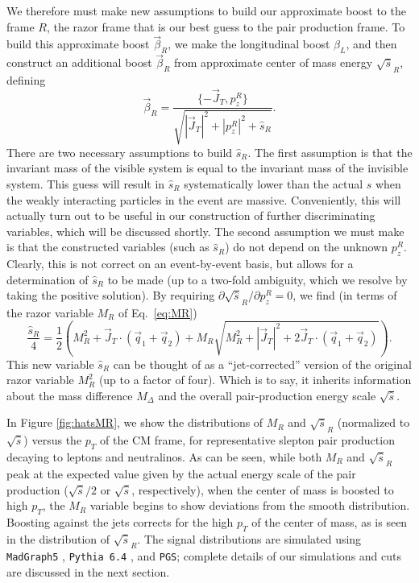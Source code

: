 We therefore must make new assumptions to build our approximate boost to the frame $R$, the razor frame that is our best guess to the pair production frame. To build this approximate boost $\vec{\beta}_R$, we make the longitudinal boost $\beta_L$, and then construct an additional boost $\vec{\beta}_R$ from approximate center of mass energy $\sqrt{\hat{s}}_R$, defining
\begin{equation}
\vec{\beta}_R = \frac{\{-\vec{J}_T,p^R_z\}}{\sqrt{|\vec{J}_T|^2+|p^R_z|^2+\hat{s}_R}}. \label{eq:razorbeta}
\end{equation}
There are two necessary assumptions to build $\hat{s}_R$. The first assumption is that the invariant mass of the visible system is equal to the invariant mass of the invisible system. This guess will result in $\hat{s}_R$ systematically lower than the actual $\hat{s}$ when the weakly interacting particles in the event are massive. Conveniently, this will actually turn out to be useful in our construction of further discriminating variables, which will be discussed shortly. The second assumption we must make is that the constructed variables (such as $\hat{s}_R$) do not depend on the unknown $p_z^R$. Clearly, this is not correct on an event-by-event basis, but allows for a determination of $\hat{s}_R$ to be made (up to a two-fold ambiguity, which we resolve by taking the positive solution). By requiring $\partial \sqrt{\hat{s}}_R/\partial p_z^R = 0$, we find (in terms of the razor variable $M_R$ of Eq.~\eqref{eq:MR})
\begin{equation}
\frac{\hat{s}_R}{4} = \frac{1}{2}\left( M_R^2 + \vec{J}_T\cdot(\vec{q}_1+\vec{q}_2) + M_R \sqrt{M_R^2+|\vec{J}_T|^2+2\vec{J}_T\cdot(\vec{q}_1+\vec{q}_2)}\right). \label{eq:hatsR}
\end{equation}
This new variable $\hat{s}_R$ can be thought of as a ``jet-corrected'' version of the original razor variable $M_R^2$ (up to a factor of four). Which is to say, it inherits information about the mass difference $M_\Delta$ and the overall pair-production energy scale $\sqrt{\hat{s}}$. 

In Figure \ref{fig:hatsMR}, we show the distributions of $M_R$ and $\sqrt{\hat{s}}_R$ (normalized to $\sqrt{\hat{s}}$) versus the $p_T$ of the CM frame, for representative slepton pair production decaying to leptons and neutralinos. As can be seen, while both $M_R$ and $\sqrt{\hat{s}}_R$ peak at the expected value given by the actual energy scale of the pair production ($\sqrt{\hat{s}}/2$ or $\sqrt{\hat{s}}$, respectively), when the center of mass is boosted to high $p_T$, the $M_R$ variable begins to show deviations from the smooth distribution. Boosting against the jets corrects for the high $p_T$ of the center of mass, as is seen in the distribution of $\sqrt{\hat{s}}_R$. The signal distributions are simulated using {\tt MadGraph5} \cite{Alwall:2011uj}, {\tt Pythia 6.4}  \cite{Sjostrand:2006za}, and {\tt PGS}; complete details of our simulations and cuts are discussed in the next section. 

